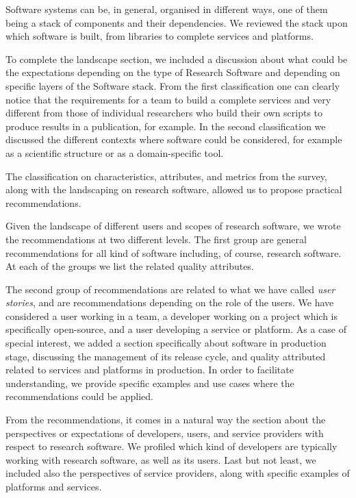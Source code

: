 Software systems can be, in general, organised in different ways, one of them being a stack of components and their dependencies. We reviewed the stack upon which software is built, from libraries to complete services and platforms. 

To complete the landscape section, we included a discussion about what could be the expectations depending on the type of Research Software and depending on specific layers of the Software stack. From the first classification one can clearly notice that the requirements for a team to build a complete services and very different from those of individual researchers who build their own scripts to produce results in a publication, for example. In the second classification we discussed the different contexts where software could be considered, for example as a scientific structure or as a domain-specific tool.

The classification on characteristics, attributes, and metrics from the survey, along with the landscaping on research software, allowed us to propose  practical recommendations.

Given the landscape of different users and scopes of research software, we wrote the recommendations at two different levels. The first group are general recommendations for all kind of software including, of course, research software. At each of the groups we list the related quality attributes.

The second group of recommendations are related to what we have called \textit{user stories}, and are recommendations depending on the role of the users. We have considered a user working in a team, a developer working on a project which is specifically open-source, and a user developing a service or platform.
%
As a case of special interest, we added a section specifically about software in production stage, discussing the management of its release cycle, and quality attributed related to services and platforms in production.
%
In order to facilitate understanding, we provide specific examples and use cases where the recommendations could be applied.

From the recommendations, it comes in a natural way the section about the perspectives or expectations of developers, users, and service providers with respect to research software. We profiled which kind of developers are typically working with research software, as well as its users. Last but not least, we included also the perspectives of service providers, along with specific examples of platforms and services.


